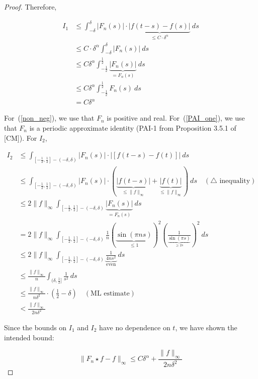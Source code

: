 \documentclass[12pt, reqno]{article}
\theoremstyle{definition}
\theoremstyle{remark}
\begin{document}
\begin{itemize}
\begin{proof}
Therefore, 

\begin{align}
I_{1}&\le \int_{- \delta}^{\delta}\left|F_{n}(s)\right|\cdot \underbrace{\left|f(t-s)-f(s)\right|}_{\le C\cdot \delta^\alpha}\ ds\\
&\le C\cdot \delta^{\alpha}\int_{-\delta}^{\delta}|F_{n}(s)|\ ds\\
&\le C\delta^{\alpha}\int_{- \frac{1}{2}}^{\frac{1}{2}}\underbrace{|F_{n}(s)|}_{=F_{n}(s)}\ ds\\
&\le C\delta^{\alpha}\int_{- \frac{1}{2}}^{\frac{1}{2}}F_{n}(s)\ ds \label{non_neg}\\
&= C\delta^{\alpha} \label{PAI_one}
\end{align}

For~(\ref{non_neg}), we use that $F_{n}$ is positive and real. For~(\ref{PAI_one}), we use that $F_{n}$ is a periodic approximate identity (PAI-1 from Proposition 3.5.1 of [CM]).
For $I_{2}$, 

\begin{align*}
I_{2}&\le \int_{[-\frac{1}{2},\frac{1}{2}]-(-\delta,\delta)}|F_{n}(s)|\cdot|[f(t-s)-f(t)]|\ ds\\
&\le \int_{[-\frac{1}{2},\frac{1}{2}]-(-\delta,\delta)}|F_{n}(s)|\cdot(\underbrace{|f(t-s)|}_{\le\|f\|_\infty}+\underbrace{|f(t)|}_{\le\|f\|_\infty})\ ds\quad(\triangle \text{ inequality})\\
&\le 2\|f\|_{\infty}\int_{[-\frac{1}{2},\frac{1}{2}]-(-\delta,\delta)}\underbrace{|F_{n}(s)|}_{=F_n(s)}\ ds\\
&= 2\|f\|_{\infty}\int_{[-\frac{1}{2},\frac{1}{2}]-(-\delta,\delta)} \frac{1}{n} \left(\underbrace{\sin(\pi n s)}_{\le1}\right)^{2}\left(\frac{1}{\underbrace{\sin(\pi s)}_{\ge 2s}}\right)^{2}\ ds\\
&\le 2\|f\|_{\infty}\int_{[- \frac{1}{2}, \frac{1}{2}]-(-\delta,\delta)} \underbrace{\frac{1}{4ns^{2}}}_\text{even}\ ds\\
&\le \frac{\|f\|_{\infty}}{n}\int_{(\delta,\frac{1}{2}]} \frac{1}{s^{2}}\ ds\\
&\le \frac{\|f\|_{\infty}}{n\delta^{2}}\cdot\left(\frac{1}{2}-\delta\right)\quad(\text{ML estimate})\\
&< \frac{\|f\|_{\infty}}{2n\delta^{2}}
\end{align*}

Since the bounds on $I_{1}$ and $I_{2}$ have no dependence on $t$, we have shown the intended bound: 

\[
\|F_{n}\star f-f\|_{\infty}\le C\delta^{\alpha}+ \frac{\|f\|_{\infty}}{2n\delta^{2}}
\]


\end{proof}
\end{itemize}
\end{document}
